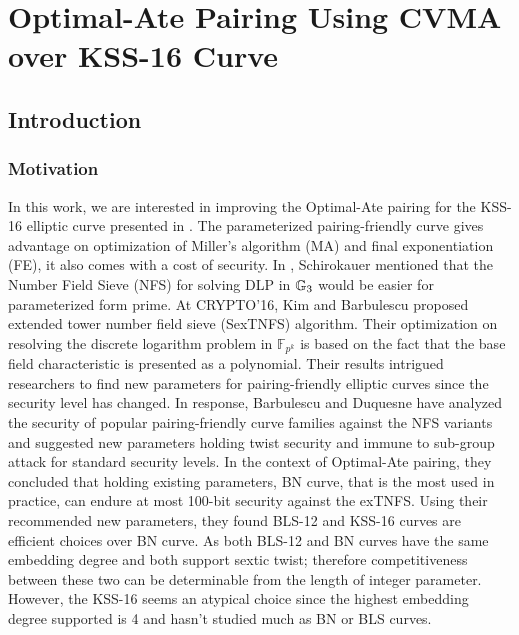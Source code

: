 \chapter{Optimal-Ate Pairing Using CVMA over KSS-16 Curve} 
\label{ch:cvma_indocrypt}

\section{Introduction}
\label{intro}

\subsection{Motivation}
In this work, we are interested in improving the Optimal-Ate pairing for the KSS-16 elliptic curve presented in .
 The parameterized pairing-friendly curve gives advantage on optimization of Miller's algorithm (MA) and final exponentiation (FE), it also comes with a cost of security. 
In \cite{DBLP:journals/moc/Schirokauer10}, Schirokauer mentioned that the Number Field Sieve (NFS) for solving DLP in ${\mathbb{G}}_{3}$ would be easier for parameterized form prime. 
At CRYPTO'16, Kim and Barbulescu proposed extended tower number field sieve (SexTNFS) algorithm\cite{C:KimBar16}.
Their optimization on resolving the discrete logarithm problem in $\mathbb{F}_{p^k}$ is based on the fact that the base field characteristic is presented as a polynomial.
Their results intrigued researchers to find new parameters for pairing-friendly elliptic curves since the security level has changed.
In response, Barbulescu and Duquesne have analyzed the security of popular pairing-friendly curve families against the NFS variants and suggested new parameters \cite{EPRINT:BarDuq17} holding twist security and immune to sub-group attack for standard security levels. 
In the context of Optimal-Ate pairing, they concluded that holding existing parameters, BN curve, that is the most used in practice, can endure at most 100-bit security against the exTNFS.  
Using their recommended new parameters, they found BLS-12 and KSS-16 curves are efficient choices over BN curve.
As both BLS-12 and BN curves have the same embedding degree and both support sextic twist; therefore competitiveness between these two can be determinable from the length of integer parameter.
However, the KSS-16 seems an atypical choice since the highest embedding degree supported is 4 and hasn't studied much as BN or BLS curves.

